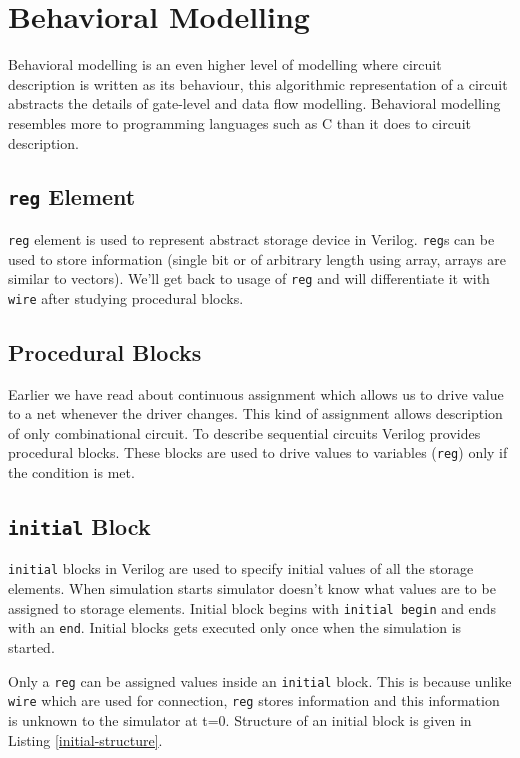 \documentclass[a4paper,10pt]{article}
\theoremstyle{mytheor}
\newcounter{pitfallCount} %
\newcommand{\pitfallcounter}[1]{%
  \refstepcounter{pitfallCount}%
  \thepitfallCount%
  \label{#1}}%
\newcommand{\pitfall}[2] {
  \begin{tcolorbox}[arc=1pt,colback=yellow!10!white,colframe=orange!75!black,title=\textbf{Common Pitfall - \pitfallcounter{#1}}]
    #2
  \end{tcolorbox}
}
\newcommand{\inlinev}[1]{\lstinline[style=verilog-inline-style]{#1}}
\begin{document}
\section{Behavioral Modelling}
Behavioral modelling is an even higher level of modelling where
circuit description is written as its behaviour, this algorithmic
representation of a circuit abstracts the details of gate-level and
data flow modelling. Behavioral modelling resembles more to
programming languages such as C than it does to circuit description.


\subsection{\inlinev{reg} Element}
\inlinev{reg} element is used to represent abstract storage device in
Verilog. \inlinev{reg}s can be used to store information (single bit
or of arbitrary length using array, arrays are similar to
vectors). We'll get back to usage of \inlinev{reg} and will
differentiate it with \inlinev{wire} after studying procedural blocks.

\subsection{Procedural Blocks}
Earlier we have read about continuous assignment which allows us to
drive value to a net whenever the driver changes. This kind of
assignment allows description of only combinational circuit. To
describe sequential circuits Verilog provides procedural blocks. These
blocks are used to drive values to variables (\inlinev{reg}) only if
the condition is met.

\subsection{\inlinev{initial} Block}
\inlinev{initial} blocks in Verilog are used to specify initial values
of all the storage elements. When simulation starts simulator doesn't
know what values are to be assigned to storage elements. Initial block
begins with \inlinev{initial begin} and ends with an
\inlinev{end}. Initial blocks gets executed only once when the
simulation is started.

\pitfall{pitfall:reg-vs-wire}{Only a \inlinev{reg} can be assigned values inside an
  \inlinev{initial} block. This is because unlike \inlinev{wire} which
  are used for connection, \inlinev{reg} stores information and this
  information is unknown to the simulator at t=0. Structure of an
  initial block is given in Listing \ref{initial-structure}.}
\end{document}
